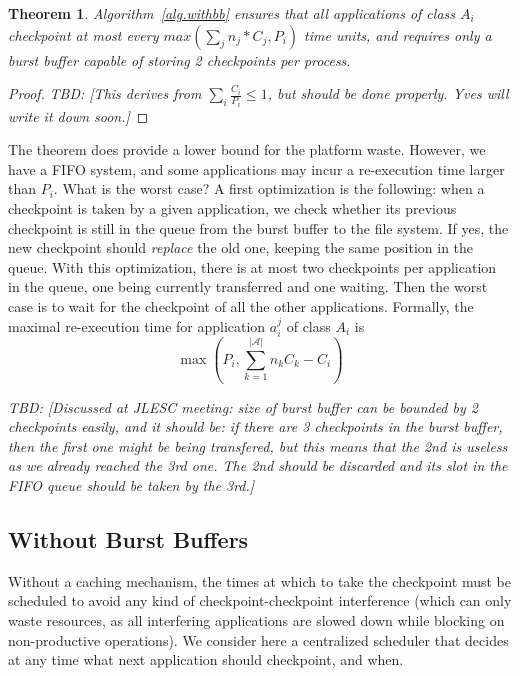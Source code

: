 \documentclass{article}
\newtheorem{theorem}{Theorem}
\newcommand{\nbapps}{|{\mathcal A}|}
\newcommand{\app}[1]{A_{#1}}
\newcommand{\application}[2]{a_{#1}^{#2}}
\newcommand{\nbapp}[1]{n_{#1}}
\newcommand{\period}[1]{P_{#1}}
\newcommand{\ckpt}[1]{C_{#1}}
\newcommand{\todo}[1]{\textit{TBD: [#1]}}
\begin{document}
\begin{theorem}
  Algorithm~\ref{alg.withbb} ensures that all applications of class $\app{i}$
  checkpoint at most every $max(\sum_j\nbapp{j}*\ckpt{j}, \period{i})$
  time units, and requires only a burst buffer capable of storing 2
  checkpoints per process.
\end{theorem}

\begin{proof}
  \todo{This derives from $\sum_i \frac{\ckpt{i}}{\period{i}} \leq 1$,
    but should be done properly. Yves will write it down soon.}
\end{proof}
    
The theorem does provide a lower bound for the platform waste.
However, we have a FIFO system, and some applications may incur
a re-execution time larger than $P_{i}$. What is the worst case?
A first optimization is the following: when a checkpoint is taken
    by a given application, we check whether its previous checkpoint is
    still in the queue from the burst buffer to the file system. If yes, the new
checkpoint should \emph{replace} the old one, keeping the same position in the queue.
With this optimization, there is at most two checkpoints per application in the queue,
one being currently transferred and one waiting.
Then the worst case is to wait for the checkpoint of all the other applications.
Formally, the maximal re-execution time for application
$\application{i}{j}$ of class
$\app{i}$ is
$$\max(P_{i}, \sum_{k=1}^{\nbapps} n_{k}C_{k} - C_{i})$$

 \todo{Discussed at JLESC meeting: size of burst buffer can be
    bounded by 2 checkpoints easily, and it should be: if there are 3
    checkpoints in the burst buffer, then the first one might be being
    transfered, but this means that the 2nd is useless as we already
    reached the 3rd one. The 2nd should be discarded and its slot in
    the FIFO queue should be taken by the 3rd.}

\subsection{Without Burst Buffers}

Without a caching mechanism, the times at which to take the checkpoint
must be scheduled to avoid any kind of checkpoint-checkpoint
interference (which can only waste resources, as all interfering
applications are slowed down while blocking on non-productive
operations). We consider here a centralized scheduler that decides at
any time what next application should checkpoint, and when.
\end{document}
